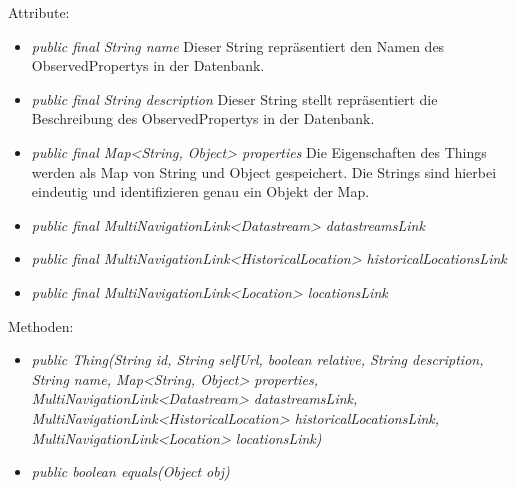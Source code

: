 Attribute:
\begin{itemize}
    \item \emph{public final String name} Dieser String repräsentiert den Namen des ObservedPropertys in der Datenbank.
    \item \emph{public final String description} Dieser String stellt repräsentiert die Beschreibung des ObservedPropertys in der Datenbank.
    \item \emph{public final Map<String, Object> properties} Die Eigenschaften des Things werden als Map von String und Object gespeichert. Die Strings sind hierbei eindeutig und identifizieren genau ein Objekt der Map.
    \item \emph{public final MultiNavigationLink<Datastream> datastreamsLink} 
    \item \emph{public final MultiNavigationLink<HistoricalLocation> historicalLocationsLink} 
    \item \emph{public final MultiNavigationLink<Location> locationsLink} 
\end{itemize}
Methoden:
\begin{itemize}
    \item \emph{public Thing(String id, String selfUrl, boolean relative, String description, String name, Map<String, Object> properties, MultiNavigationLink<Datastream> datastreamsLink, MultiNavigationLink<HistoricalLocation> historicalLocationsLink, MultiNavigationLink<Location> locationsLink)}
    \item \emph{public boolean equals(Object obj)} 
\end{itemize}

